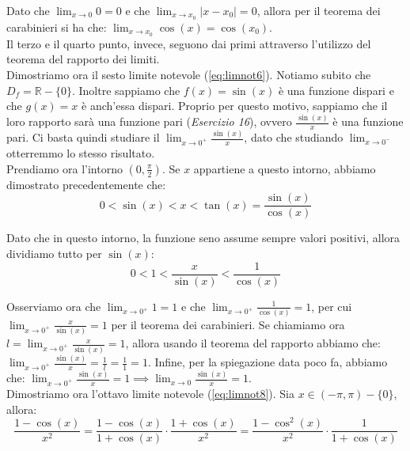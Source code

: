\documentclass{article}
\begin{document}
\noindent Dato che $\lim_{x \to 0} 0 = 0$ e che $\lim_{x \to x_0} |x - x_0| = 0$, allora per il teorema dei carabinieri si ha che: $\lim_{x \to x_0} \cos(x) = \cos(x_0)$.\\

\noindent Il terzo e il quarto punto, invece, seguono dai primi attraverso l'utilizzo del teorema del rapporto dei limiti.\\

\noindent Dimostriamo ora il sesto limite notevole (\ref{eq:limnot6}). Notiamo subito che $D_f = \mathbb{R} - \{0\}$. Inoltre sappiamo che $f(x) = \sin(x)$ è una funzione dispari e che $g(x) = x$ è anch'essa dispari. Proprio per questo motivo, sappiamo che il loro rapporto sarà una funzione pari (\textit{Esercizio 16}), ovvero $\frac{\sin(x)}{x}$ è una funzione pari. Ci basta quindi studiare il $\lim_{x \to 0^+} \frac{\sin(x)}{x}$, dato che studiando $\lim_{x \to 0^-}$ otterremmo lo stesso risultato.\\
Prendiamo ora l'intorno $(0, \frac{\pi}{2})$. Se $x$ appartiene a questo intorno, abbiamo dimostrato precedentemente che:
\begin{equation*}
    0 < \sin(x) < x < \tan(x) = \frac{\sin(x)}{\cos(x)}
\end{equation*}

\noindent Dato che in questo intorno, la funzione seno assume sempre valori positivi, allora dividiamo tutto per $\sin(x)$:
\begin{equation*}
    0 < 1 < \frac{x}{\sin(x)} < \frac{1}{\cos(x)}
\end{equation*}

\noindent Osserviamo ora che $\lim_{x \to 0^+} 1 = 1$ e che $\lim_{x \to 0^+} \frac{1}{\cos(x)} = 1$, per cui $\lim_{x \to 0^+} \frac{x}{\sin(x)} = 1$ per il teorema dei carabinieri. Se chiamiamo ora $l = \lim_{x \to 0^+} \frac{x}{\sin(x)} = 1$, allora usando il teorema del rapporto abbiamo che: $\lim_{x \to 0^+} \frac{\sin(x)}{x} = \frac{1}{l} = \frac{1}{1} = 1$. Infine, per la spiegazione data poco fa, abbiamo che: $\lim_{x \to 0^+} \frac{\sin(x)}{x} = 1 \implies \lim_{x \to 0} \frac{\sin(x)}{x} = 1$.\\

\noindent Dimostriamo ora l'ottavo limite notevole (\ref{eq:limnot8}). Sia $x \in (-\pi, \pi) - \{0\}$, allora:
\begin{equation*}
    \frac{1 - \cos(x)}{x^2} = \frac{1 - \cos(x)}{1 + \cos(x)} \cdot \frac{1 + \cos(x)}{x^2} = \frac{1 - \cos^2(x)}{x^2} \cdot \frac{1}{1 + \cos(x)}
\end{equation*}
\end{document}
